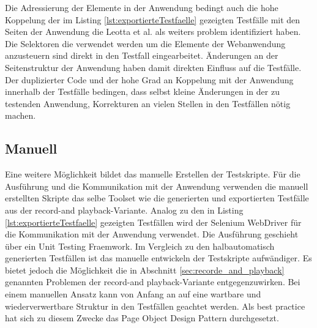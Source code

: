 Die Adressierung der Elemente in der Anwendung bedingt auch die hohe Koppelung der im Listing \ref{lst:exportierteTestfaelle} gezeigten Testfälle mit den Seiten der Anwendung die Leotta et al. \cite{leotta_repairing_2013} als weiters problem identifiziert haben. Die Selektoren die verwendet werden um die Elemente der Webanwendung anzusteuern sind direkt in den Testfall eingearbeitet. Änderungen an der Seitenstruktur der Anwendung haben damit direkten Einfluss auf die Testfälle.\\
Der duplizierter Code und der hohe Grad an Koppelung mit der Anwendung innerhalb der Testfälle bedingen, dass selbst kleine Änderungen in der zu testenden Anwendung, Korrekturen an vielen Stellen in den Testfällen nötig machen.

\subsection{Manuell}
\label{sec:manuell}
Eine weitere Möglichkeit bildet das manuelle Erstellen der Testskripte. Für die Ausführung und die Kommunikation mit der Anwendung verwenden die manuell erstellten Skripte das selbe Toolset wie die generierten und exportierten Testfälle aus der \grq record-and playback\grq -Variante. Analog zu den in Listing \ref{lst:exportierteTestfaelle} gezeigten Testfällen wird der Selenium WebDriver für die Kommunikation mit der Anwendung verwendet. Die Ausführung geschieht über ein Unit Testing Fraemwork.
Im Vergleich zu den halbautomatisch generierten Testfällen ist das manuelle entwickeln der Testskripte aufwändiger.
Es bietet jedoch die Möglichkeit die in Abschnitt \ref{sec:recorde_and_playback} genannten Problemen der \grq record-and playback\grq -Variante entgegenzuwirken.
Bei einem manuellen Ansatz kann von Anfang an auf eine wartbare und wiederverwertbare Struktur in den Testfällen geachtet werden.
Als best practice hat sich zu diesem Zwecke das Page Object Design Pattern durchgesetzt.

